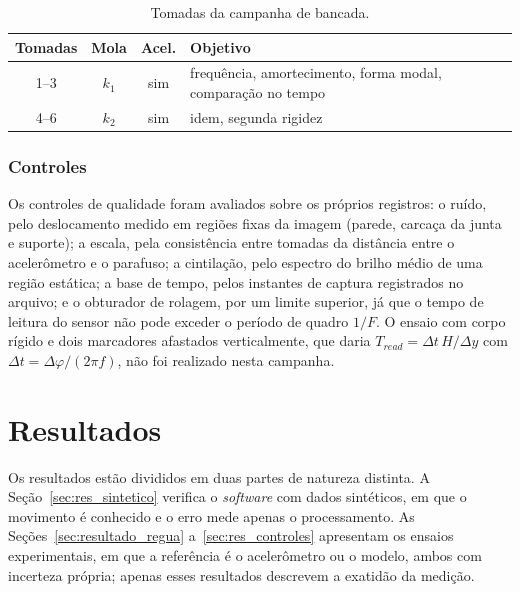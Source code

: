 \documentclass[a4paper,10pt,twocolumn]{article}
\begin{document}
\begin{table}[H]
    \centering
    \caption{Tomadas da campanha de bancada.}
    \label{tab:tomadas}
    \small
    \begin{tabularx}{\columnwidth}{c c c X}
        \toprule
        \textbf{Tomadas} & \textbf{Mola} & \textbf{Acel.} & \textbf{Objetivo} \\
        \midrule
        1--3 & $k_1$ & sim & frequência, amortecimento, forma modal, comparação no tempo \\
        4--6 & $k_2$ & sim & idem, segunda rigidez \\
        \bottomrule
    \end{tabularx}
\end{table}

\subsubsection{Controles}
\label{sec:controles}

Os controles de qualidade foram avaliados sobre os próprios registros: o ruído, pelo deslocamento medido em regiões fixas da imagem (parede, carcaça da junta e suporte); a escala, pela consistência entre tomadas da distância entre o acelerômetro e o parafuso; a cintilação, pelo espectro do brilho médio de uma região estática; a base de tempo, pelos instantes de captura registrados no arquivo; e o obturador de rolagem, por um limite superior, já que o tempo de leitura do sensor não pode exceder o período de quadro $1/F$. O ensaio com corpo rígido e dois marcadores afastados verticalmente, que daria $T_{read} = \Delta t\,H/\Delta y$ com $\Delta t = \Delta\varphi/(2\pi f)$, não foi realizado nesta campanha.

\section{Resultados}
\label{sec:resultados}

Os resultados estão divididos em duas partes de natureza distinta. A Seção~\ref{sec:res_sintetico} verifica o \textit{software} com dados sintéticos, em que o movimento é conhecido e o erro mede apenas o processamento. As Seções~\ref{sec:resultado_regua} a~\ref{sec:res_controles} apresentam os ensaios experimentais, em que a referência é o acelerômetro ou o modelo, ambos com incerteza própria; apenas esses resultados descrevem a exatidão da medição.
\end{document}
